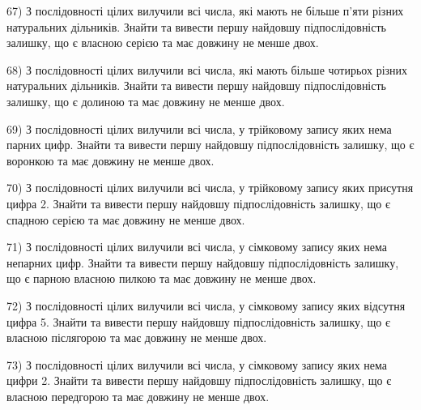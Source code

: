 \documentclass[11pt, ukrainian]{article}
\begin{document}
\par
\vspace{0.9cm}
67) \space 
З послідовності цілих вилучили всі числа, які мають не більше п'яти різних натуральних дільників. Знайти та вивести першу найдовшу підпослідовність залишку, що є власною серією та має довжину не менше двох.

\par
\vspace{0.9cm}
68) \space 
З послідовності цілих вилучили всі числа, які мають більше чотирьох різних натуральних дільників. Знайти та вивести першу найдовшу підпослідовність залишку, що є долиною та має довжину не менше двох.

\par
\vspace{0.9cm}
69) \space 
З послідовності цілих вилучили всі числа, у трійковому запису яких нема парних цифр. Знайти та вивести першу найдовшу підпослідовність залишку, що є воронкою та має довжину не менше двох.

\par
\vspace{0.9cm}
70) \space 
З послідовності цілих вилучили всі числа, у трійковому запису яких присутня цифра 2. Знайти та вивести першу найдовшу підпослідовність залишку, що є спадною серією та має довжину не менше двох.

\par
\vspace{0.9cm}
71) \space 
З послідовності цілих вилучили всі числа, у сімковому запису яких нема непарних цифр. Знайти та вивести першу найдовшу підпослідовність залишку, що є парною власною пилкою та має довжину не менше двох.

\par
\vspace{0.9cm}
72) \space 
З послідовності цілих вилучили всі числа, у сімковому запису яких відсутня цифра 5. Знайти та вивести першу найдовшу підпослідовність залишку, що є власною післягорою та має довжину не менше двох.

\par
\vspace{0.9cm}
73) \space 
З послідовності цілих вилучили всі числа, у сімковому запису яких нема цифри 2. Знайти та вивести першу найдовшу підпослідовність залишку, що є власною передгорою та має довжину не менше двох.
\end{document}
